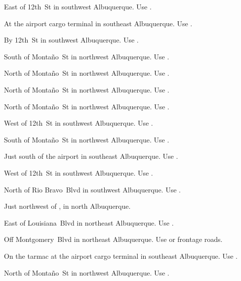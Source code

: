 
\begin{LocationList}

East of 12th~St in southwest Albuquerque.
Use  .

At the airport cargo terminal in southeast Albuquerque.
Use  .

By 12th~St in southwest Albuquerque.
Use  .

South of Monta\~no~St in northwest Albuquerque.
Use  .

North of Monta\~no~St in northwest Albuquerque.
Use  .

\Location{\GarageHQ \Garage}
North of Monta\~no~St in northwest Albuquerque.
Use  .

North of Monta\~no~St in northwest Albuquerque.
Use  .

West of 12th~St in southwest Albuquerque.
Use  .

South of Monta\~no~St in northwest Albuquerque.
Use  .

Just south of the airport in southeast Albuquerque.
Use  .

West of 12th~St in southwest Albuquerque.
Use  .

North of Rio Bravo~Blvd in southwest Albuquerque.
Use  .

Just northwest of  , in north Albuquerque.

East of Louisiana~Blvd in northeast Albuquerque.
Use  .

\Location{\TruckStop \Gas \Rest}
Off Montgomery~Blvd in northeast Albuquerque.
Use   or frontage roads.

On the tarmac at the airport cargo terminal in southeast Albuquerque.
Use  .

North of Monta\~no~St in northwest Albuquerque.
Use  .

\end{LocationList}


